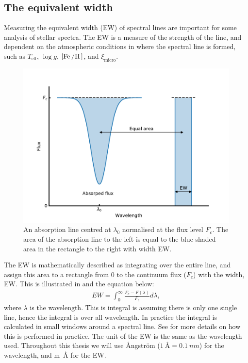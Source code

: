 \subsection{The equivalent width}
\label{sec:EW}

Measuring the equivalent width (EW) of spectral lines are important for some analysis of stellar
spectra. The EW is a measure of the strength of the line, and dependent on the atmospheric
conditions in where the spectral line is formed, such as $T_\mathrm{eff}$, $\log g$,
$[\ion{Fe}/\ion{H}]$, and $\xi_\mathrm{micro}$.

\begin{figure}[htpb!]
    \centering
    \includegraphics[width=0.85\linewidth]{figures/ewTheoretical.pdf}
    \caption{An absorption line centred at $\lambda_0$ normalised at the flux level $F_c$. The area
             of the absorption line to the left is equal to the blue shaded area in the rectangle to
             the right with width EW.}
    \label{fig:ewTheoretical}
\end{figure}

The EW is mathematically described as integrating over the entire line, and assign this area to a
rectangle from 0 to the continuum flux ($F_c$) with the width, EW. This is illustrated in
 and the equation below: \begin{align} EW = \int_{0}^{\infty}
\frac{F_c-F(\lambda)}{F_c} d\lambda, \end{align} where $\lambda$ is the wavelength. This is integral
is assuming there is only one single line, hence the integral is over all wavelength. In practice
the integral is calculated in small windows around a spectral line. See  for
more details on how this is performed in practice. The unit of the EW is the same as the wavelength
used. Throughout this thesis we will use \AA{}ngstr\"{o}m ($\SI{1}{\angstrom}=\SI{0.1}{nm}$) for the
wavelength, and \si{m\angstrom} for the EW.


